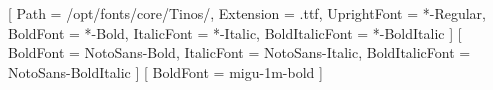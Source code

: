 \usepackage{fontspec}

\setmainfont{Tinos}[ %
  Path = /opt/fonts/core/Tinos/,
  Extension = .ttf,
  UprightFont = *-Regular,
  BoldFont = *-Bold,
  ItalicFont = *-Italic,
  BoldItalicFont = *-BoldItalic
]
\setsansfont{NotoSans}[ %
  BoldFont = NotoSans-Bold,
  ItalicFont = NotoSans-Italic,
  BoldItalicFont = NotoSans-BoldItalic  
]
\setmonofont{migu-1m-regular}[
  BoldFont = migu-1m-bold
]





